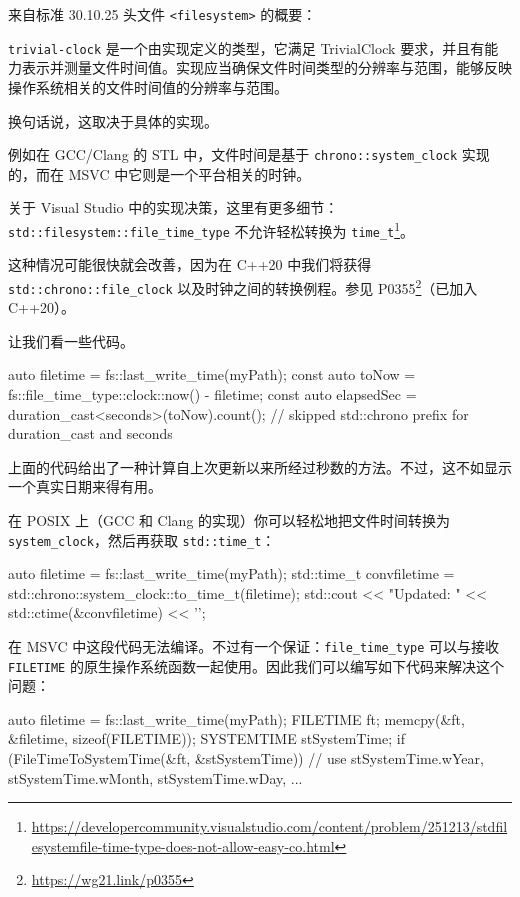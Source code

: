 来自标准 30.10.25 头文件 \texttt{<filesystem>} 的概要：

\texttt{trivial-clock} 是一个由实现定义的类型，它满足 TrivialClock 要求，并且有能力表示并测量文件时间值。实现应当确保文件时间类型的分辨率与范围，能够反映操作系统相关的文件时间值的分辨率与范围。

换句话说，这取决于具体的实现。

例如在 GCC/Clang 的 STL 中，文件时间是基于 \texttt{chrono::system\_clock} 实现的，而在 MSVC 中它则是一个平台相关的时钟。

关于 Visual Studio 中的实现决策，这里有更多细节：\texttt{std::filesystem::file\_time\_type} 不允许轻松转换为 \texttt{time\_t}\footnote{\url{https://developercommunity.visualstudio.com/content/problem/251213/stdfilesystemfile-time-type-does-not-allow-easy-co.html}}。

这种情况可能很快就会改善，因为在 C++20 中我们将获得 \texttt{std::chrono::file\_clock} 以及时钟之间的转换例程。参见 P0355\footnote{\url{https://wg21.link/p0355}}（已加入 C++20）。

让我们看一些代码。

\begin{codebox}[cpp]
auto filetime = fs::last_write_time(myPath);
const auto toNow = fs::file_time_type::clock::now() - filetime;
const auto elapsedSec = duration_cast<seconds>(toNow).count();
// skipped std::chrono prefix for duration_cast and seconds
\end{codebox}

上面的代码给出了一种计算自上次更新以来所经过秒数的方法。不过，这不如显示一个真实日期来得有用。

在 POSIX 上（GCC 和 Clang 的实现）你可以轻松地把文件时间转换为 \texttt{system\_clock}，然后再获取 \texttt{std::time\_t}：

\begin{codebox}[cpp]
auto filetime = fs::last_write_time(myPath);
std::time_t convfiletime = std::chrono::system_clock::to_time_t(filetime);
std::cout << "Updated: " << std::ctime(&convfiletime) << '\n';
\end{codebox}

在 MSVC 中这段代码无法编译。不过有一个保证：\texttt{file\_time\_type} 可以与接收 \texttt{FILETIME} 的原生操作系统函数一起使用。因此我们可以编写如下代码来解决这个问题：

\begin{codebox}[cpp]
auto filetime = fs::last_write_time(myPath);
FILETIME ft;
memcpy(&ft, &filetime, sizeof(FILETIME));
SYSTEMTIME
stSystemTime;
if (FileTimeToSystemTime(&ft, &stSystemTime)) {
    // use stSystemTime.wYear, stSystemTime.wMonth, stSystemTime.wDay, ...
}
\end{codebox}

